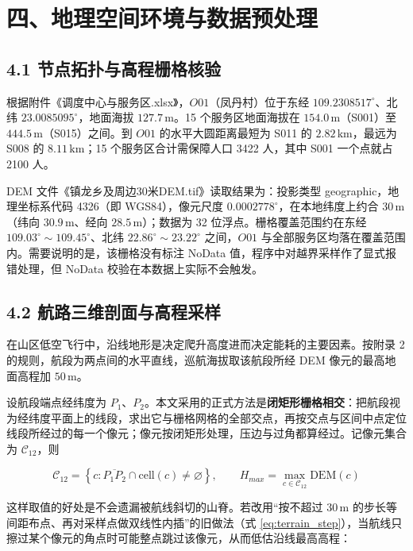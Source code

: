 \documentclass[withoutpreface,bwprint]{format}
\begin{document}
\clearpage
\section{四、地理空间环境与数据预处理}

\subsection{4.1 节点拓扑与高程栅格核验}
根据附件《调度中心与服务区.xlsx》，$O01$（凤丹村）位于东经 $109.2308517^\circ$、北纬 $23.0085095^\circ$，地面海拔 $127.7\,\text{m}$。15 个服务区地面海拔在 $154.0\,\text{m}$（S001）至 $444.5\,\text{m}$（S015）之间。到 $O01$ 的水平大圆距离最短为 S011 的 $2.82\,\text{km}$，最远为 S008 的 $8.11\,\text{km}$；15 个服务区合计需保障人口 3422 人，其中 S001 一个点就占 2100 人。

DEM 文件《镇龙乡及周边30米DEM.tif》读取结果为：投影类型 geographic，地理坐标系代码 4326（即 WGS84），像元尺度 $0.0002778^\circ$，在本地纬度上约合 $30\,\text{m}$（纬向 $30.9\,\text{m}$、经向 $28.5\,\text{m}$）；数据为 32 位浮点。栅格覆盖范围约在东经 $109.03^\circ\sim109.45^\circ$、北纬 $22.86^\circ\sim23.22^\circ$ 之间，$O01$ 与全部服务区均落在覆盖范围内。需要说明的是，该栅格没有标注 NoData 值，程序中对越界采样作了显式报错处理，但 NoData 校验在本数据上实际不会触发。

\subsection{4.2 航路三维剖面与高程采样}
在山区低空飞行中，沿线地形是决定爬升高度进而决定能耗的主要因素\cite{roberge2013}。按附录 2 的规则，航段为两点间的水平直线，巡航海拔取该航段所经 DEM 像元的最高地面高程加 $50\,\text{m}$。

设航段端点经纬度为 $P_1$、$P_2$。本文采用的正式方法是\textbf{闭矩形栅格相交}：把航段视为经纬度平面上的线段，求出它与栅格网格的全部交点，再按交点与区间中点定位线段所经过的每一个像元；像元按闭矩形处理，压边与过角都算经过。记像元集合为 $\mathcal{C}_{12}$，则

\begin{equation}
\mathcal{C}_{12} = \left\{ c : \overline{P_1 P_2} \cap \text{cell}(c) \neq \varnothing \right\}, \qquad
H_{max} = \max_{c \in \mathcal{C}_{12}} \text{DEM}(c)
\label{eq:terrain_closed}
\end{equation}

这样取值的好处是不会遗漏被航线斜切的山脊。若改用“按不超过 $30\,\text{m}$ 的步长等间距布点、再对采样点做双线性内插”的旧做法（式 \ref{eq:terrain_step}），当航线只擦过某个像元的角点时可能整点跳过该像元，从而低估沿线最高高程：
\end{document}
